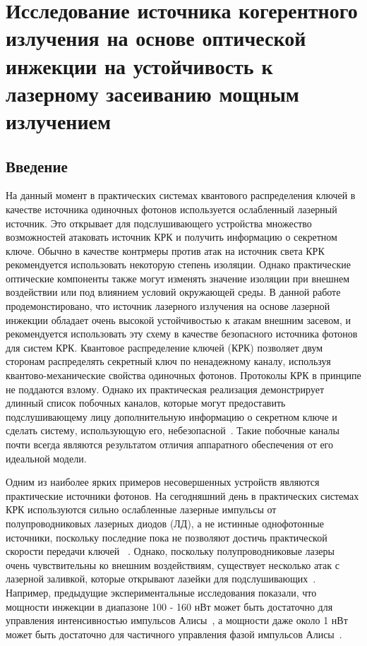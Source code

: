 \chapter{Исследование источника когерентного излучения на основе оптической инжекции на устойчивость к лазерному засеиванию мощным излучением}\label{ch:ch5}
\section{Введение}
На данный момент в практических системах квантового распределения ключей в качестве источника одиночных фотонов используется ослабленный лазерный источник. Это открывает для подслушивающего устройства множество возможностей атаковать источник КРК и получить информацию о секретном ключе. Обычно в качестве контрмеры против атак на источник света КРК рекомендуется использовать некоторую степень изоляции. Однако практические оптические компоненты также могут изменять значение изоляции при внешнем воздействии или под влиянием условий окружающей среды. В данной работе продемонстировано, что источник лазерного излучения на основе  лазерной инжекции обладает очень высокой устойчивостью к атакам внешним засевом, и рекомендуется использовать эту схему в качестве безопасного источника фотонов для систем КРК.
Квантовое распределение ключей (КРК) позволяет двум сторонам распределять секретный ключ по ненадежному каналу, используя квантово-механические свойства одиночных фотонов. Протоколы КРК в принципе не поддаются взлому. Однако их практическая реализация демонстрирует длинный список побочных каналов, которые могут предоставить подслушивающему лицу дополнительную информацию о секретном ключе и сделать систему, использующую его, небезопасной~\cite{sun2022, makarov2023}. Такие побочные каналы почти всегда являются результатом отличия аппаратного обеспечения от его идеальной модели. 

Одним из наиболее ярких примеров несовершенных устройств являются практические источники фотонов. На сегодняшний день в практических системах КРК используются сильно ослабленные лазерные импульсы от полупроводниковых лазерных диодов (ЛД), а не истинные однофотонные источники, поскольку последние пока не позволяют достичь практической скорости передачи ключей ~\cite{zahidy2024}.
Однако, поскольку полупроводниковые лазеры очень чувствительны ко внешним воздействиям, существует несколько атак с лазерной заливкой, которые открывают лазейки для подслушивающих~\cite{huang2019, pang2020, lovic2023}. Например, предыдущие экспериментальные исследования показали, что мощности инжекции в диапазоне 100 - 160 нВт может быть достаточно для управления интенсивностью импульсов Алисы~\cite{huang2019, pang2020}, а мощности даже около 1 нВт может быть достаточно для частичного управления фазой импульсов Алисы~\cite{lovic2023}.

